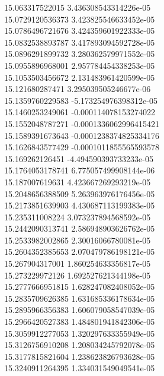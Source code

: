 {15.063317522015 3.436308543314226e-05 \\
15.0729120536373 3.423825546633452e-05 \\
15.0786496721676 3.424359601922333e-05 \\
15.0832538893787 3.417893094592728e-05 \\
15.0896291899732 3.280362579971552e-05 \\
15.0955896968001 2.957784454338253e-05 \\
15.1053503456672 2.131483961420599e-05 \\
15.121680287471 3.295039505246677e-06 \\
15.1359760229583 -5.173254976398312e-05 \\
15.1460253249061 -0.000114078153274022 \\
15.1552048787271 -0.0001336062996415421 \\
15.1589391673643 -0.0001238374825334176 \\
15.1626843577429 -0.0001011855565593578 \\
15.169262126451 -4.494590393733233e-05 \\
15.1764053178741 6.775057499908144e-06 \\
15.187007619631 4.423667269293219e-05 \\
15.2048656388509 5.263963976176456e-05 \\
15.2173851639903 4.430687113199383e-05 \\
15.235311008224 3.073237894568592e-05 \\
15.2442090313741 2.586948903626762e-05 \\
15.2533982002865 2.30016066780081e-05 \\
15.2604352385653 2.070479786198121e-05 \\
15.267904317001 1.860254633356817e-05 \\
15.273229972126 1.692527621344198e-05 \\
15.2777666951815 1.628247082408052e-05 \\
15.2835709626385 1.631685336178634e-05 \\
15.2895966356383 1.606079058547039e-05 \\
15.2966420527383 1.484801941842306e-05 \\
15.3059912277053 1.320297633355949e-05 \\
15.3126756910208 1.208034245792078e-05 \\
15.3177815821604 1.238623826793628e-05 \\
15.3240911264395 1.334031549049541e-05 \\
}
